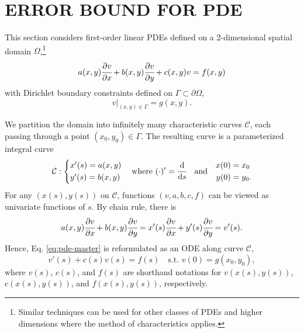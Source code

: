\documentclass[accepted]{uai2023}
\newcommand{\px}[1]{\cfrac{\partial #1}{\partial x}}
\newcommand{\py}[1]{\cfrac{\partial #1}{\partial y}}
\newcommand{\ds}[1]{\cfrac{\mathrm{d} #1}{\mathrm{d} s}}
\begin{document}
\section{ERROR BOUND FOR PDE} \label{section:error-bound-for-pde}
    This section considers first-order linear PDEs defined on a 2-dimensional spatial domain $\Omega$,\footnote{Similar techniques can be used for other classes of PDEs and higher dimensions where the method of characteristics applies.} 
    { 
        \small
        \begin{equation}\label{eq:pde-master}
            a(x, y) \px{v} + b(x, y) \py{v} + c(x, y)v = f(x, y)
        \end{equation}
    }
    with Dirichlet boundary constraints defined on $\Gamma \subset \partial \Omega$,
    {
        \small
        \begin{equation}\label{eq:pde-bc-master}
            v\big|_{(x, y) \in \Gamma} = g(x, y).
        \end{equation}
    }

    We partition the domain into infinitely many characteristic curves $\mathcal{C}$, each passing through a point $(x_0, y_0) \in \Gamma$. The resulting curve is a parameterized integral curve 
    {
        \small
        \begin{equation*} 
            \mathcal{C}: \begin{cases*}
                x'(s) = a(x, y) \\
                y'(s) = b(x, y) 
            \end{cases*} 
            \quad
            \text{where}
            \,\,
            (\cdot)' = \ds{}
            \quad
            \text{and} 
            \quad
            \begin{aligned}
                x(0) &= x_0 \\
                y(0) &= y_0.
            \end{aligned}
        \end{equation*}
    }
    For any $(x(s), y(s))$ on $\mathcal{C}$, functions $(v, a, b, c, f)$ can be viewed as univariate functions of $s$. By chain rule, there is
    {
        \small
        \begin{equation*}
            a(x, y)\px{v} + b(x, y)\py{v} = x'(s)\px{v}  + y'(s)\py{v} = v'(s).
        \end{equation*}
    }
    Hence, Eq. \ref{eq:pde-master} is reformulated as an ODE along curve $\mathcal{C}$,
    {
        \small
        \begin{equation}
            v'(s) + c(s) v(s) = f(s) \quad \text{s.t. } v(0) = g(x_0, y_0),
        \end{equation}
    }
    where $v(s)$, $c(s)$, and $f(s)$ are shorthand notations for $v(x(s),y(s))$, $c(x(s),y(s))$, and $f(x(s),y(s))$, respectively.
\end{document}
